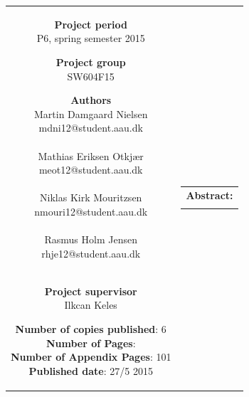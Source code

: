 \begin{nopagebreak}
{\begin{tabular}{cc}
{        \textbf{Project period} \\ 
        P6, spring semester 2015 \\

        \textbf{Project group} \\
        SW604F15 \\

        \textbf{Authors} \\
        Martin Damgaard Nielsen\\
        mdni12@student.aau.dk 
        \\\\
        Mathias Eriksen Otkjær\\
        meot12@student.aau.dk 
        \\\\
        Niklas Kirk Mouritzsen\\
        nmouri12@student.aau.dk 
        \\\\
        Rasmus Holm Jensen\\
        rhje12@student.aau.dk 
        \\\\

        \textbf{Project supervisor} \\ 
        Ilkcan Keles \\

        \textbf{Number of copies published}: 6 \\
        \textbf{Number of Pages}: \pageref{LastPage} \\
        \textbf{Number of Appendix Pages}: 101 \\
        \textbf{Published date}: 27/5 2015 \\

        \vfill 

    } &
    \parbox{7cm}
    {
        \vspace{.15cm}
        \hfill 
        \begin{tabular}{l}
            {\bf Abstract:}\bigskip \\
            \fbox{
                \parbox{7cm}
                {
                    \bigskip
                    {\vfill{\small \bigskip}}
                }
            }
        \end{tabular}
    }

\end{tabular}}
\\ \\ \\ \\ \\ \\ \\ 
\begin{center}
\end{center}

\restoregeometry
\end{nopagebreak}